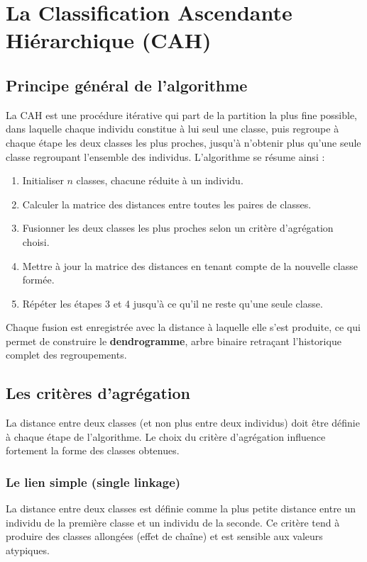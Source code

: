 \documentclass[11pt,a4paper]{report}
\begin{document}
	\chapter{La Classification Ascendante Hiérarchique (CAH)}
	
	\section{Principe général de l'algorithme}
	
	La CAH est une procédure itérative qui part de la partition la plus fine possible, dans laquelle chaque individu constitue à lui seul une classe, puis regroupe à chaque étape les deux classes les plus proches, jusqu'à n'obtenir plus qu'une seule classe regroupant l'ensemble des individus. L'algorithme se résume ainsi :
	
	\begin{enumerate}
		\item Initialiser $n$ classes, chacune réduite à un individu.
		\item Calculer la matrice des distances entre toutes les paires de classes.
		\item Fusionner les deux classes les plus proches selon un critère d'agrégation choisi.
		\item Mettre à jour la matrice des distances en tenant compte de la nouvelle classe formée.
		\item Répéter les étapes 3 et 4 jusqu'à ce qu'il ne reste qu'une seule classe.
	\end{enumerate}
	
	Chaque fusion est enregistrée avec la distance à laquelle elle s'est produite, ce qui permet de construire le \textbf{dendrogramme}, arbre binaire retraçant l'historique complet des regroupements.
	
	\section{Les critères d'agrégation}
	
	La distance entre deux classes (et non plus entre deux individus) doit être définie à chaque étape de l'algorithme. Le choix du critère d'agrégation influence fortement la forme des classes obtenues.
	
	\subsection{Le lien simple (single linkage)}
	La distance entre deux classes est définie comme la plus petite distance entre un individu de la première classe et un individu de la seconde. Ce critère tend à produire des classes allongées (effet de chaîne) et est sensible aux valeurs atypiques.
	
\end{document}
